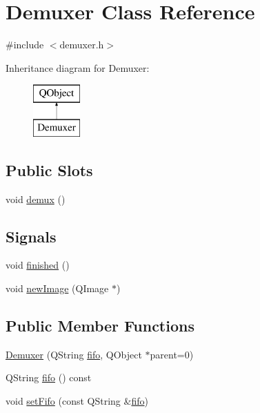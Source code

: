 \hypertarget{classDemuxer}{\section{Demuxer Class Reference}
\label{classDemuxer}
}


{\ttfamily \#include $<$demuxer.\-h$>$}

Inheritance diagram for Demuxer\-:\begin{figure}[H]
\begin{center}
\leavevmode
\includegraphics[height=2.000000cm]{classDemuxer}
\end{center}
\end{figure}
\subsection*{Public Slots}
\begin{DoxyCompactItemize}
\item 
void \hyperlink{classDemuxer_a95c38d118f61403a2828da35afc39c5f}{demux} ()
\end{DoxyCompactItemize}
\subsection*{Signals}
\begin{DoxyCompactItemize}
\item 
void \hyperlink{classDemuxer_a62e1d551bc7e73a9fa23587b1960b92f}{finished} ()
\item 
void \hyperlink{classDemuxer_a0a8254e06b4450d65428e9d1f641c8cd}{new\-Image} (Q\-Image $\ast$)
\end{DoxyCompactItemize}
\subsection*{Public Member Functions}
\begin{DoxyCompactItemize}
\item 
\hyperlink{classDemuxer_a266feb24cfea87bee1883b480694478d}{Demuxer} (Q\-String \hyperlink{classDemuxer_a4bd7bbc10d0c5356ac541b5f168fde93}{fifo}, Q\-Object $\ast$parent=0)
\item 
Q\-String \hyperlink{classDemuxer_a4bd7bbc10d0c5356ac541b5f168fde93}{fifo} () const 
\item 
void \hyperlink{classDemuxer_a92ca6dbf8971a34ecac0e6b671c588ed}{set\-Fifo} (const Q\-String \&\hyperlink{classDemuxer_a4bd7bbc10d0c5356ac541b5f168fde93}{fifo})
\end{DoxyCompactItemize}


